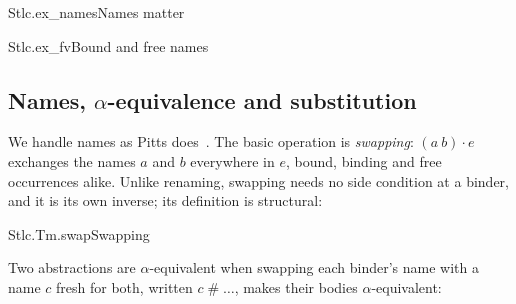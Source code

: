 \documentclass{article}
\begin{document}
\begin{leanexample}[sum=-ZmF1RzDuQ]{Stlc.ex_names}{Names matter}
\label{ex:Stlc.ex_names}
\end{leanexample}

\begin{leanexample}[sum=58i_iI8ew9]{Stlc.ex_fv}{Bound and free names}
\label{ex:Stlc.ex_fv}
\end{leanexample}

\subsection{Names, \texorpdfstring{$\alpha$}{α}-equivalence and substitution}

We handle names as Pitts does~\cite{Pitts06}. The basic operation is
\emph{swapping}: $(a\ b) \cdot e$ exchanges the names $a$ and $b$
everywhere in $e$, bound, binding and free occurrences alike. Unlike
renaming, swapping needs no side condition at a binder, and it is its own
inverse; its definition is structural:

\begin{center}
\begin{leanblock}[view=math, def, sum=kQtdL6J5XN]{Stlc.Tm.swap}{Swapping}
\end{leanblock}
\end{center}

Two abstractions are $\alpha$-equivalent when swapping each binder's name
with a name $c$ fresh for both, written $c \mathrel{\#} \ldots$, makes their
bodies $\alpha$-equivalent:
\end{document}
